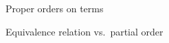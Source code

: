 \documentclass{clseminar}
\begin{document}
\begin{figure}
    \begin{center}

\caption{Proper orders on terms}
    \end{center}
\end{figure}

\begin{figure}
    \begin{center}

\caption{Equivalence relation vs.~partial order}
\end{center}
\end{figure}
\end{document}
